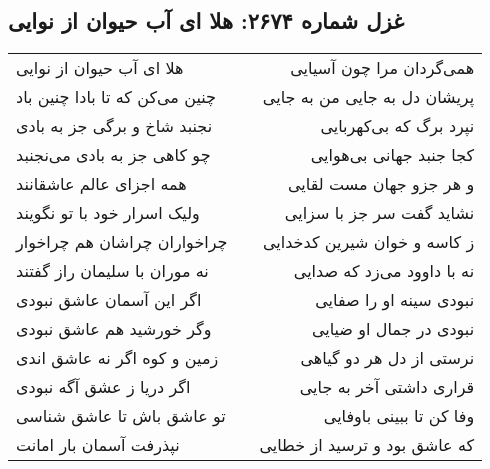 \begin{center}
\section*{غزل شماره ۲۶۷۴: هلا ای آب حیوان از نوایی}
\label{sec:2674}
\begin{longtable}{l p{0.5cm} r}
هلا ای آب حیوان از نوایی
&&
همی‌گردان مرا چون آسیایی
\\
چنین می‌کن که تا بادا چنین باد
&&
پریشان دل به جایی من به جایی
\\
نجنبد شاخ و برگی جز به بادی
&&
نپرد برگ که بی‌کهربایی
\\
چو کاهی جز به بادی می‌نجنبد
&&
کجا جنبد جهانی بی‌هوایی
\\
همه اجزای عالم عاشقانند
&&
و هر جزو جهان مست لقایی
\\
ولیک اسرار خود با تو نگویند
&&
نشاید گفت سر جز با سزایی
\\
چراخواران چراشان هم چراخوار
&&
ز کاسه و خوان شیرین کدخدایی
\\
نه موران با سلیمان راز گفتند
&&
نه با داوود می‌زد که صدایی
\\
اگر این آسمان عاشق نبودی
&&
نبودی سینه او را صفایی
\\
وگر خورشید هم عاشق نبودی
&&
نبودی در جمال او ضیایی
\\
زمین و کوه اگر نه عاشق اندی
&&
نرستی از دل هر دو گیاهی
\\
اگر دریا ز عشق آگه نبودی
&&
قراری داشتی آخر به جایی
\\
تو عاشق باش تا عاشق شناسی
&&
وفا کن تا ببینی باوفایی
\\
نپذرفت آسمان بار امانت
&&
که عاشق بود و ترسید از خطایی
\\
\end{longtable}
\end{center}
